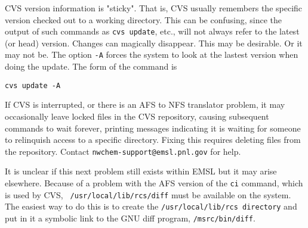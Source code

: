 CVS version information is 
"sticky".  That is, CVS usually remembers the specific version checked out
to a working directory.  This can be confusing, 
since the output of such commands as \verb+cvs update+, etc., will not 
always refer to the latest (or
head) version.  Changes can magically
disappear.  This may be desirable. Or it may not be.  The option \verb+-A+ 
forces the system to look at the lastest version when doing the update.
The form of the command is

\begin{verbatim}
cvs update -A
\end{verbatim}

If CVS is interrupted, or there is an AFS to NFS translator problem,
it may occasionally leave locked files in the CVS repository, causing
subsequent commands to wait forever, printing messages indicating it is
waiting for someone to relinquish access to a specific directory.
Fixing this requires deleting files from the repository.
Contact {\tt nwchem-support@emsl.pnl.gov} for help.

It is unclear if this next problem still exists within EMSL but it may
arise elsewhere.  Because of a problem with the AFS version of the {\tt ci}
command, which is used by CVS, {\tt
  /usr/local/lib/rcs/diff} must be available on the system.  
The easiest way to do this
is to create the {\tt /usr/local/lib/rcs directory} and put in it a
symbolic link to the GNU diff program, {\tt /msrc/bin/diff}.
